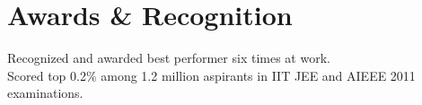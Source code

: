 \documentclass[letterpaper,11pt]{article}
\begin{document}
\section{Awards \& Recognition}
\begin{itemize}[leftmargin=0.15in, label={}]
	\small{\item{
		{Recognized and awarded best performer six times at work.} \\
		{Scored top 0.2\% among 1.2 million aspirants in IIT JEE and AIEEE 2011 examinations.} \\
		
	}}
\end{itemize}
\end{document}
